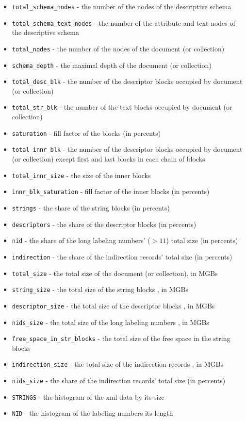 \documentclass[a4paper,12pt]{article}
\begin{document}
\begin{itemize}
\item \verb!total_schema_nodes! - the number of the nodes of the descriptive schema
\item \verb!total_schema_text_nodes! - the number of the attribute and text nodes of the descriptive schema
\item \verb!total_nodes! - the number of the nodes of the document (or collection)
\item \verb!schema_depth! - the maximal depth of the document (or collection)
\item \verb!total_desc_blk! - the number of  the descriptor blocks occupied by document (or collection)
\item \verb!total_str_blk! - the number of  the text blocks occupied by document (or collection)
\item \verb!saturation! - fill factor of the blocks (in percents)
\item \verb!total_innr_blk! - the number of  the descriptor blocks occupied by document (or collection) except first and last blocks in each chain of blocks
\item \verb!total_innr_size! - the size of the inner blocks
\item \verb!innr_blk_saturation! - fill factor of the inner blocks (in percents)
\item \verb!strings! - the share of  the string blocks (in percents)
\item \verb!descriptors! - the share of  the descriptor blocks (in percents)
\item \verb!nid! - the share of  the long labeling numbers' ($>11$) total size (in percents)
\item \verb!indirection! - the share of  the indirection records' total size (in percents)
\item \verb!total_size! - the total size of the document (or collection), in MGBs
\item \verb!string_size! - the total size of the string blocks , in MGBs
\item \verb!descriptor_size! - the total size of the descriptor blocks , in MGBs
\item \verb!nids_size! - the total size of the long labeling numbers , in MGBs
\item \verb!free_space_in_str_blocks! - the total size of the free space in the string blocks
\item \verb!indirection_size! - the total size of the indirection records , in MGBs
\item \verb!nids_size! - the share of  the indirection records' total size (in percents)
\item \verb!STRINGS! - the histogram of the xml data by its size
\item \verb!NID! - the histogram of the labeling numbers its length
\end{itemize}
\end{document}
